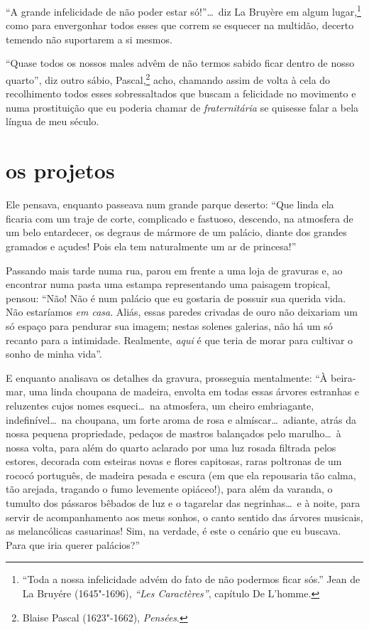 ``A grande infelicidade de não poder estar
só!''\ldots\  diz La Bruyère em algum lugar,\protect\footnote{  ``Toda a 
nossa infelicidade advém do fato de não
podermos ficar sós.'' Jean de La Bruyére (1645"-1696),
\textit{``Les Caractères''}, capítulo De L'homme.} como para
envergonhar todos esses que correm se esquecer na
multidão, decerto temendo não suportarem a si mesmos.

``Quase todos os nossos males advêm de não termos sabido
ficar dentro de nosso quarto'', diz outro sábio,
Pascal,\protect\footnote{  Blaise Pascal (1623"-1662), \textit{Pensées}.}
acho, chamando assim de volta à cela do
recolhimento todos esses sobressaltados que buscam a felicidade 
no movimento e numa prostituição que eu poderia chamar de
\textit{fraternitária} se quisesse falar a bela língua de meu século.

\quebra\section[Os projetos]{os projetos}

Ele pensava, enquanto passeava num grande parque deserto:
``Que linda ela ficaria com um traje de corte, complicado
e fastuoso, descendo, na atmosfera de um belo entardecer, os
degraus de mármore de um palácio, diante dos grandes gramados e açudes!
Pois ela tem naturalmente um ar de princesa!''

Passando mais tarde numa rua, parou em frente a uma loja de gravuras
e, ao encontrar numa pasta uma estampa representando uma paisagem
tropical, pensou: ``Não! Não é num palácio que eu gostaria
de possuir sua querida vida. Não estaríamos \textit{em casa}. Aliás, essas
paredes crivadas de ouro não deixariam um só espaço para pendurar sua
imagem; nestas solenes galerias, não há um só recanto para a
intimidade. Realmente, \textit{aqui} é que teria de morar para cultivar
o sonho de minha vida''.

E enquanto analisava os detalhes da gravura, prosseguia mentalmente:
``À beira-mar, uma linda choupana de madeira, envolta
em todas essas árvores estranhas e reluzentes cujos nomes esqueci\ldots\ 
na atmosfera, um cheiro embriagante, indefinível\ldots\  na choupana, um
forte aroma de rosa e almíscar\ldots\  adiante, atrás da nossa
pequena propriedade, pedaços de mastros balançados pelo marulho\ldots\  à nossa volta, para além do quarto aclarado por uma luz rosada filtrada
pelos estores, decorada com esteiras novas e flores capitosas, raras poltronas de um rococó português, de madeira pesada e escura (em
que ela repousaria tão calma, tão arejada, tragando o fumo
levemente opiáceo!), para além da varanda, o tumulto dos pássaros bêbados de
luz e o tagarelar das negrinhas\ldots\  e à noite, para servir de
acompanhamento aos meus sonhos, o canto sentido das árvores musicais,
as melancólicas casuarinas! Sim, na verdade, é este o cenário que eu
buscava. Para que iria querer palácios?''


